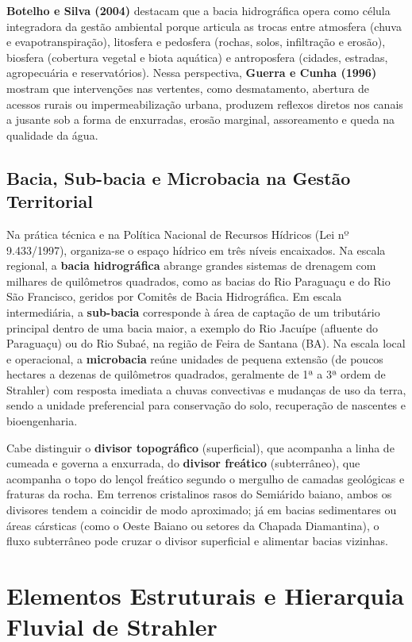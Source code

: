 \textbf{Botelho e Silva (2004)} destacam que a bacia hidrográfica opera como célula integradora da gestão ambiental porque articula as trocas entre atmosfera (chuva e evapotranspiração), litosfera e pedosfera (rochas, solos, infiltração e erosão), biosfera (cobertura vegetal e biota aquática) e antroposfera (cidades, estradas, agropecuária e reservatórios). Nessa perspectiva, \textbf{Guerra e Cunha (1996)} mostram que intervenções nas vertentes, como desmatamento, abertura de acessos rurais ou impermeabilização urbana, produzem reflexos diretos nos canais a jusante sob a forma de enxurradas, erosão marginal, assoreamento e queda na qualidade da água.

\subsection{Bacia, Sub-bacia e Microbacia na Gestão Territorial}

Na prática técnica e na Política Nacional de Recursos Hídricos (Lei nº 9.433/1997), organiza-se o espaço hídrico em três níveis encaixados. Na escala regional, a \textbf{bacia hidrográfica} abrange grandes sistemas de drenagem com milhares de quilômetros quadrados, como as bacias do Rio Paraguaçu e do Rio São Francisco, geridos por Comitês de Bacia Hidrográfica. Em escala intermediária, a \textbf{sub-bacia} corresponde à área de captação de um tributário principal dentro de uma bacia maior, a exemplo do Rio Jacuípe (afluente do Paraguaçu) ou do Rio Subaé, na região de Feira de Santana (BA). Na escala local e operacional, a \textbf{microbacia} reúne unidades de pequena extensão (de poucos hectares a dezenas de quilômetros quadrados, geralmente de 1ª a 3ª ordem de Strahler) com resposta imediata a chuvas convectivas e mudanças de uso da terra, sendo a unidade preferencial para conservação do solo, recuperação de nascentes e bioengenharia.

Cabe distinguir o \textbf{divisor topográfico} (superficial), que acompanha a linha de cumeada e governa a enxurrada, do \textbf{divisor freático} (subterrâneo), que acompanha o topo do lençol freático segundo o mergulho de camadas geológicas e fraturas da rocha. Em terrenos cristalinos rasos do Semiárido baiano, ambos os divisores tendem a coincidir de modo aproximado; já em bacias sedimentares ou áreas cársticas (como o Oeste Baiano ou setores da Chapada Diamantina), o fluxo subterrâneo pode cruzar o divisor superficial e alimentar bacias vizinhas.

\section{Elementos Estruturais e Hierarquia Fluvial de Strahler}

